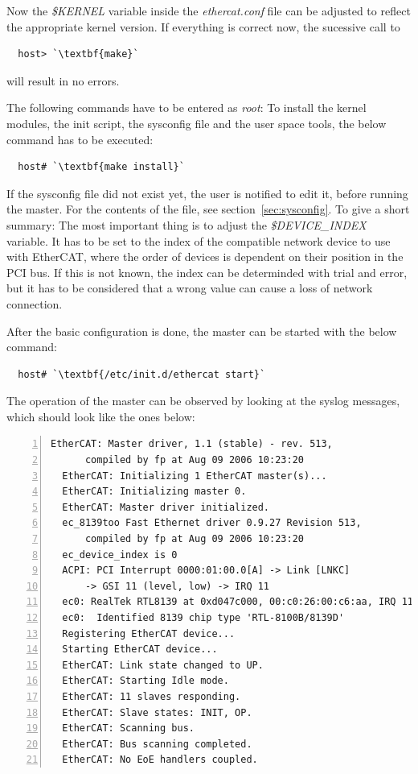 \documentclass[a4paper,12pt,BCOR6mm,bibtotoc,idxtotoc]{scrbook}
\begin{document}
Now the \textit{\$KERNEL} variable inside the \textit{ethercat.conf}
file can be adjusted to reflect the appropriate kernel version. If
everything is correct now, the sucessive call to

\begin{lstlisting}
  host> `\textbf{make}`
\end{lstlisting}

will result in no errors.

The following commands have to be entered as \textit{root}: To install
the kernel modules, the init script, the sysconfig file and the user
space tools, the below command has to be executed:

\begin{lstlisting}
  host# `\textbf{make install}`
\end{lstlisting}

If the sysconfig file did not exist yet, the user is notified to edit
it, before running the master. For the contents of the file, see
section~\ref{sec:sysconfig}. To give a short summary: The most
important thing is to adjust the \textit{\$DEVICE\_INDEX} variable. It
has to be set to the index of the compatible network device to use
with EtherCAT, where the order of devices is dependent on their
position in the PCI bus. If this is not known, the index can be
determinded with trial and error, but it has to be considered that a
wrong value can cause a loss of network connection.

After the basic configuration is done, the master can be started with
the below command:

\begin{lstlisting}
  host# `\textbf{/etc/init.d/ethercat start}`
\end{lstlisting}

The operation of the master can be observed by looking at the
syslog messages, which should look like the ones below:

\begin{lstlisting}[numbers=left]
  EtherCAT: Master driver, 1.1 (stable) - rev. 513,
      compiled by fp at Aug 09 2006 10:23:20
  EtherCAT: Initializing 1 EtherCAT master(s)...
  EtherCAT: Initializing master 0.
  EtherCAT: Master driver initialized.
  ec_8139too Fast Ethernet driver 0.9.27 Revision 513,
      compiled by fp at Aug 09 2006 10:23:20
  ec_device_index is 0
  ACPI: PCI Interrupt 0000:01:00.0[A] -> Link [LNKC]
      -> GSI 11 (level, low) -> IRQ 11
  ec0: RealTek RTL8139 at 0xd047c000, 00:c0:26:00:c6:aa, IRQ 11
  ec0:  Identified 8139 chip type 'RTL-8100B/8139D'
  Registering EtherCAT device...
  Starting EtherCAT device...
  EtherCAT: Link state changed to UP.
  EtherCAT: Starting Idle mode.
  EtherCAT: 11 slaves responding.
  EtherCAT: Slave states: INIT, OP.
  EtherCAT: Scanning bus.
  EtherCAT: Bus scanning completed.
  EtherCAT: No EoE handlers coupled.
\end{lstlisting}
\end{document}
